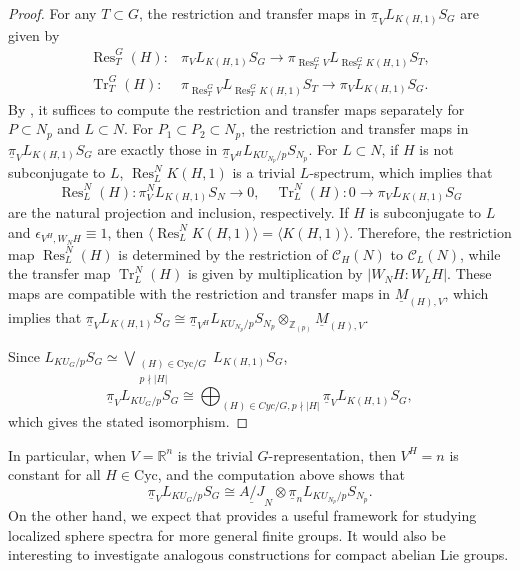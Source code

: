 \documentclass{amsart}
\theoremstyle{plain}
\theoremstyle{definition}
\theoremstyle{remark}
\begin{document}
\begin{proof}
        
        For any $T\subset G$, the restriction and transfer maps in $\underline{\pi}_V L_{K(H,1)}S_G$ are given by
        \[
        \begin{aligned}
            \operatorname{Res}_T^G(H): &\pi_V  L_{K(H,1)}S_G \to \pi_{\operatorname{Res}_T^G V}L_{\operatorname{Res}_T^G K(H,1)} S_T,\\
             \operatorname{Tr}_T^G(H): &\pi_{\operatorname{Res}_T^G V}L_{\operatorname{Res}_T^G K(H,1)} S_T\to \pi_V  L_{K(H,1)}S_G.
        \end{aligned}
        \]
        By , it suffices to compute the restriction and transfer maps separately for $P\subset N_p$ and $L\subset N$.         For $P_1\subset P_2\subset N_p$, the restriction and transfer maps in $\underline{\pi}_V L_{K(H,1)}S_G$ are exactly those in $\underline{\pi}_{V^H} L_{KU_{N_p}/p}S_{N_p}$. 
        For $L \subset N$, if $H$ is not subconjugate to $L$, $\operatorname{Res}_L^N K(H,1)$ is a trivial $L$-spectrum, which implies that  
        \[
        \operatorname{Res}_L^N(H):\pi_V^N  L_{K(H,1)}S_N\to 0, \quad \operatorname{Tr}_L^N(H):0\to \pi_V  L_{K(H,1)}S_G
        \]
        are the natural projection and inclusion, respectively.
        If $H$ is subconjugate to $L$ and $\epsilon_{V^H,W_NH}\equiv 1$, then $\langle \operatorname{Res}_L^N K(H,1)\rangle = \langle K(H,1) \rangle$. 
        Therefore, the restriction map $\operatorname{Res}_L^N(H)$ is determined by the restriction of $\mathcal{C}_H(N)$ to $\mathcal{C}_L(N)$, while the transfer map $\operatorname{Tr}_L^N(H)$ is given by multiplication by $|W_N H:W_L H|$. These maps are compatible with the restriction and transfer maps in $\underline{M}_{(H),V}$, which implies that $\underline{\pi}_V L_{K(H,1)}S_G\cong \underline{\pi}_{V^H} L_{KU_{N_p}/p}S_{N_p}\otimes_{\mathbb Z_{(p)}}\underline{M}_{(H),V}$. 

        Since $L_{KU_G/p}S_G \simeq \bigvee_{\substack{(H)\in \mathrm{Cyc}/G\\ p\nmid |H|}} L_{K(H,1)}S_G$, 
        \[\underline{\pi}_VL_{KU_G/p}S_G\cong \bigoplus_{(H)\in Cyc/G, p\nmid |H|}\underline{\pi}_{V} L_{K(H,1)}S_G,\]
        which gives the stated isomorphism.
\end{proof}

    In particular, when $V=\mathbb R^n$ is the trivial $G$-representation, then $V^H=n$ is constant for all $H\in \mathrm{Cyc}$, and the computation above shows that
    \[
    \underline{\pi}_V L_{KU_G/p}S_G \cong \underline{A/J}_N \otimes \underline{\pi}_n L_{KU_{N_p}/p}S_{N_p}.
    \]
    On the other hand, we expect that  provides a useful framework for studying localized sphere spectra for more general finite groups. It would also be interesting to investigate analogous constructions for compact abelian Lie groups. 
\end{document}

